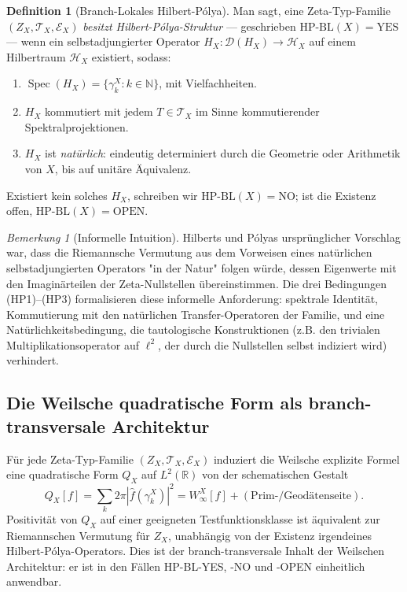 \documentclass[11pt]{article}
\theoremstyle{definition}
\newtheorem{definition}[theorem]{Definition}
\theoremstyle{remark}
\newtheorem{remark}[theorem]{Bemerkung}
\newcommand{\HBL}{\mathrm{HP\text{-}BL}}
\newcommand{\Spec}{\operatorname{Spec}}
\begin{document}
\begin{definition}[Branch-Lokales Hilbert-P\'olya]\label{def:hp-bl}
Man sagt, eine Zeta-Typ-Familie $(Z_X, \mathcal{T}_X, \mathcal{E}_X)$
\emph{besitzt Hilbert-P\'olya-Struktur} --- geschrieben $\HBL(X) = \mathrm{YES}$ ---
wenn ein selbstadjungierter Operator $H_X : \mathcal{D}(H_X) \to \mathcal{H}_X$ auf
einem Hilbertraum $\mathcal{H}_X$ existiert, sodass:
\begin{enumerate}
\item[(HP1)] $\Spec(H_X) = \{\gamma_k^X : k \in \mathbb{N}\}$, mit Vielfachheiten.
\item[(HP2)] $H_X$ kommutiert mit jedem $T \in \mathcal{T}_X$ im Sinne
  kommutierender Spektralprojektionen.
\item[(HP3)] $H_X$ ist \emph{natürlich}: eindeutig determiniert durch die
  Geometrie oder Arithmetik von $X$, bis auf unitäre Äquivalenz.
\end{enumerate}
Existiert kein solches $H_X$, schreiben wir $\HBL(X) = \mathrm{NO}$;
ist die Existenz offen, $\HBL(X) = \mathrm{OPEN}$.
\end{definition}

\begin{remark}[Informelle Intuition]\label{rem:hp-informal}
Hilberts und P\'olyas ursprünglicher Vorschlag war, dass die Riemannsche
Vermutung aus dem Vorweisen eines natürlichen selbstadjungierten Operators
"in der Natur" folgen würde, dessen Eigenwerte mit den Imaginärteilen der
Zeta-Nullstellen übereinstimmen. Die drei Bedingungen (HP1)--(HP3)
formalisieren diese informelle Anforderung: spektrale Identität, Kommutierung mit den
natürlichen Transfer-Operatoren der Familie, und eine Natürlichkeitsbedingung,
die tautologische Konstruktionen (z.B. den trivialen Multiplikationsoperator
auf $\ell^2$, der durch die Nullstellen selbst indiziert wird) verhindert.
\end{remark}

\subsection{Die Weilsche quadratische Form als branch-transversale Architektur}
\label{sec:weil-qf}

Für jede Zeta-Typ-Familie $(Z_X, \mathcal{T}_X, \mathcal{E}_X)$ induziert die
Weilsche explizite Formel \cite{Weil1952} eine quadratische Form $Q_X$
auf $L^2(\mathbb{R})$ von der schematischen Gestalt
\begin{equation}
\label{eq:weil-qf-generic}
  Q_X[f] = \sum_k 2\pi |\widehat{f}(\gamma_k^X)|^2
    = W^X_\infty[f] + (\text{Prim-/Geodätenseite}).
\end{equation}
Positivität von $Q_X$ auf einer geeigneten Testfunktionsklasse ist äquivalent
zur Riemannschen Vermutung für $Z_X$, unabhängig von der Existenz
irgendeines Hilbert-P\'olya-Operators. Dies ist der branch-transversale
Inhalt der Weilschen Architektur: er ist in den Fällen HP-BL-YES, -NO
und -OPEN einheitlich anwendbar.
\end{document}
